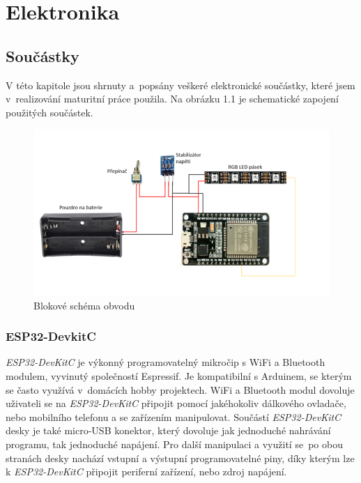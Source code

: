 \chapter{Elektronika}

\section{Součástky}
V této kapitole jsou shrnuty a~popsány veškeré elektronické součástky, které jsem v~realizování maturitní práce použila.
Na obrázku 1.1 je schematické zapojení použitých součástek.

\begin{figure}[htbp]
	\centering
	\includegraphics[width=1\textwidth]{img/01 uvod/RGB Schema.png}
	\caption{Blokové schéma obvodu}
\end{figure}

\subsection{ESP32-DevkitC}
\textit{ESP32-DevKitC}\cite{devkitc-datasheet} je výkonný programovatelný mikročip s WiFi a Bluetooth modulem, vyvinutý společností Espressif\cite{espressif}. Je kompatibilní s Arduinem\cite{arduino}, se kterým se často využívá v~domácích hobby projektech. WiFi a Bluetooth modul dovoluje uživateli se na \textit{ESP32-DevKitC} připojit pomocí jakéhokoliv dálkového ovladače, nebo mobilního telefonu a se zařízením manipulovat.
Součástí \textit{ESP32-DevKitC} desky je také micro-USB konektor, který dovoluje jak jednoduché nahrávání programu, tak jednoduché napájení. Pro další manipulaci a využití se~po obou stranách desky nachází vstupní a výstupní programovatelné piny, díky kterým lze k \textit{ESP32-DevKitC} připojit periferní zařízení, nebo zdroj napájení.

